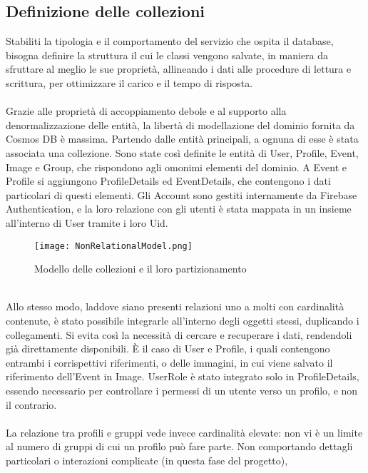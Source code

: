 \clearpage

\subsection{Definizione delle collezioni}

Stabiliti la tipologia e il comportamento del servizio che ospita il database,
bisogna definire la struttura il cui le classi vengono salvate,
in maniera da sfruttare al meglio le sue proprietà,
allineando i dati alle procedure di lettura e scrittura,
per ottimizzare il carico e il tempo di risposta.\\
\\
Grazie alle proprietà di accoppiamento debole e al supporto alla denormalizzazione delle entità,
la libertà di modellazione del dominio fornita da Cosmos DB è massima.
Partendo dalle entità principali, a ognuna di esse è stata associata una collezione.
Sono state così definite le entità di User, Profile, Event, Image e Group,
che rispondono agli omonimi elementi del dominio.
A Event e Profile si aggiungono ProfileDetails ed EventDetails,
che contengono i dati particolari di questi elementi.
Gli Account sono gestiti internamente da Firebase Authentication,
e la loro relazione con gli utenti è stata mappata in un insieme all'interno di User
tramite i loro Uid.\\
\begin{figure}[htbp]
    \centering
    \texttt{[image: NonRelationalModel.png]}
    \caption{Modello delle collezioni e il loro partizionamento}
\end{figure}
\\
Allo stesso modo, laddove siano presenti relazioni uno a molti con cardinalità contenute,
è stato possibile integrarle all'interno degli oggetti stessi, duplicando i collegamenti.
Si evita così la necessità di cercare e recuperare i dati, 
rendendoli già direttamente disponibili.
È il caso di User e Profile, i quali contengono entrambi i corrispettivi riferimenti,
o delle immagini, in cui viene salvato il riferimento dell'Event in Image.
UserRole è stato integrato solo in ProfileDetails,
essendo necessario per controllare i permessi di un utente verso un profilo, e non il contrario.\\
\\
La relazione tra profili e gruppi vede invece cardinalità elevate:
non vi è un limite al numero di gruppi di cui un profilo può fare parte.
Non comportando dettagli particolari o interazioni complicate (in questa fase del progetto),
